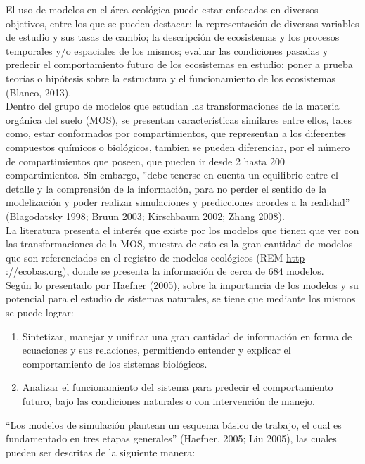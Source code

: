El uso de modelos en el \'area ecol\'ogica puede estar enfocados en diversos objetivos, entre los que se pueden destacar: la representaci\'on de diversas variables de estudio y sus tasas de cambio; la descripci\'on de ecosistemas y los procesos temporales y/o espaciales de los mismos; evaluar las condiciones pasadas y predecir el comportamiento futuro de los ecosistemas en estudio; poner a prueba teor\'ias o hip\'otesis sobre la estructura y el funcionamiento de los ecosistemas (Blanco, 2013).\\

Dentro del grupo de modelos que estudian las transformaciones de la materia org\'anica del suelo (MOS), se presentan caracter\'isticas similares entre ellos, tales como, estar conformados por compartimientos, que representan a los diferentes compuestos qu\'imicos o biol\'ogicos, tambien  se pueden diferenciar, por el n\'umero de compartimientos que poseen, que pueden ir desde 2 hasta 200 compartimientos. Sin embargo, ''debe tenerse en cuenta un equilibrio entre el detalle y la comprensi\'on de la informaci\'on, para no perder el sentido de la modelizaci\'on y poder realizar simulaciones y predicciones acordes a la realidad'' (Blagodatsky 1998; Bruun 2003; Kirschbaum 2002;  Zhang 2008).\\


La literatura presenta el inter\'es que existe por los modelos que tienen que ver con las transformaciones de la MOS, muestra de esto es la gran cantidad de modelos que son referenciados en el registro de modelos ecol\'ogicos (REM \url{http ://ecobas.org}), donde se presenta la informaci\'on de cerca de 684 modelos.\\

Seg\'un lo presentado por Haefner (2005), sobre la importancia de los modelos y su potencial para el estudio de sistemas naturales, se tiene que mediante los mismos se puede lograr:

\begin{enumerate}
  \item Sintetizar, manejar y unificar una gran cantidad de informaci\'on en forma de ecuaciones y sus relaciones, permitiendo entender y explicar el comportamiento de los sistemas biol\'ogicos.
 \item Analizar el funcionamiento del sistema para predecir el comportamiento futuro, bajo las condiciones naturales o con intervenci\'on de manejo.
\end{enumerate}

``Los modelos de simulaci\'on plantean un esquema b\'asico de trabajo, el cual es fundamentado en tres etapas generales'' (Haefner, 2005; Liu 2005), las cuales pueden ser descritas de la siguiente manera:

